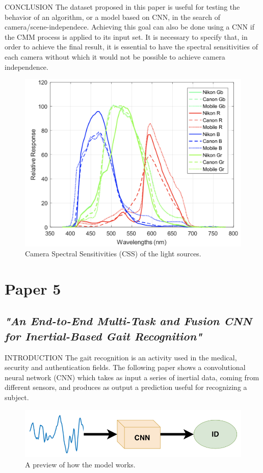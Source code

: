 \documentclass[10pt]{beamer}
\begin{document}
\begin{frame}{CONCLUSION}
    The dataset proposed in this paper is useful for testing the behavior of 
    an algorithm, or a model based on CNN, in the search of camera/scene-independece. 
    Achieving this goal can also be done using a CNN if the CMM process is 
    applied to its input set. It is necessary to specify that, in order to 
    achieve the final result, it is essential to have the spectral sensitivities of each camera 
    without which it would not be possible to achieve camera independence.
    \begin{figure}[htbp]
        \centering
        \includegraphics[width = 0.5 \linewidth]{images/paper4/CSS.png}
        \centering
        \caption{Camera Spectral Sensitivities (CSS) of the light sources.}
        \label{fig:CNNtec1}
    \end{figure}
\end{frame}

\section{Paper 5}
\subsection{\emph{"An End-to-End Multi-Task and Fusion CNN for Inertial-Based Gait Recognition"}}

\begin{frame}{INTRODUCTION}
    The gait recognition is an activity used in the medical, security and 
    authentication fields. The following paper shows a convolutional neural 
    network (CNN) which takes as input a series of inertial data, coming 
    from different sensors, and produces as output a prediction useful for 
    recognizing a subject.
    \begin{figure}[htbp]
        \centering
        \includegraphics[width = 0.6 \linewidth]{images/paper5/usecase.png}
        \centering
        \caption{A preview of how the model works.}
        \label{fig:preview}
    \end{figure}
\end{frame}
\end{document}
